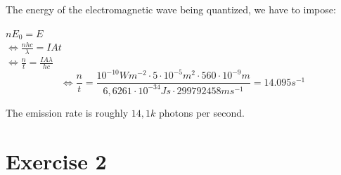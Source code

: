 \documentclass[a4paper,german,12pt]{scrartcl}
\begin{document}
\begin{enumerate}[(a)]
The energy of the electromagnetic wave being quantized, we have to impose:
\begin{center}
$nE_0=E$\\
$\Leftrightarrow \frac{nhc}{\lambda}=IAt$\\
$\Leftrightarrow \frac{n}{t}=\frac{IA\lambda}{hc}$
\begin{equation*}
\Leftrightarrow \frac{n}{t}=\frac{10^{-10}Wm^{-2}\cdot 5\cdot10^{-5}m^2\cdot 560\cdot 10^{-9}m}{6,6261\cdot 10^{-34}Js \cdot 299792458ms^{-1}}=14.095s^{-1}
\end{equation*}
\end{center}

The emission rate is roughly $14,1k$ photons per second.

\end{enumerate}

\section*{Exercise 2}
\end{document}
